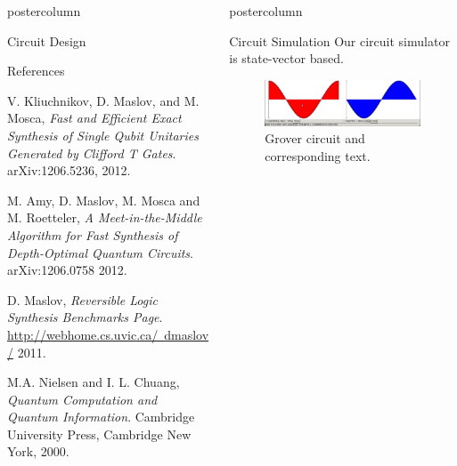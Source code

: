\documentclass[final]{beamer} %
\begin{document}
\begin{frame}{}
\begin{columns}
\begin{column}{.33\textwidth}
\begin{beamercolorbox}[center,wd=\textwidth]{postercolumn}
\begin{minipage}[T]{.95\textwidth}
\begin{block}{\large Circuit Design}
           \end{block}

           \begin{block}{\large References}
		\begin{thebibliography}{9}
\small{
  		V. Kliuchnikov, D. Maslov, and M. Mosca,
  		\emph{Fast and Efficient Exact Synthesis of Single Qubit Unitaries Generated by Clifford T Gates}.
  		arXiv:1206.5236,
  		2012.

  		M. Amy, D. Maslov, M. Mosca and M. Roetteler,
  		\emph{A Meet-in-the-Middle Algorithm for Fast Synthesis of Depth-Optimal Quantum Circuits}.
  		arXiv:1206.0758
  		2012.

  		D. Maslov,
  		\emph{Reversible Logic Synthesis Benchmarks Page}.
  		\href{http://webhome.cs.uvic.ca/~dmaslov/}{http://webhome.cs.uvic.ca/~dmaslov/}
  		2011.

  		M.A. Nielsen and I. L. Chuang, 
  		\emph{Quantum Computation and Quantum Information}.
  		Cambridge University Press,
		Cambridge New York,
  		2000.
}
		\end{thebibliography}
           \end{block}

         \end{minipage}
      \end{beamercolorbox}
    \end{column}

    \begin{column}{.33\textwidth}
      \begin{beamercolorbox}[center,wd=\textwidth]{postercolumn}
         \begin{minipage}[T]{.95\textwidth}
           \begin{block}{\large Circuit Simulation}
              Our circuit simulator is state-vector based.

                    \centering 
		\begin{figure}[!htbp]
		  \centering
		  \includegraphics{figures/state.PNG}
		  \caption{Grover circuit and corresponding text.}
		\end{figure}


\end{block}
\end{minipage}
\end{beamercolorbox}
\end{column}
\end{columns}
\end{frame}
\end{document}

